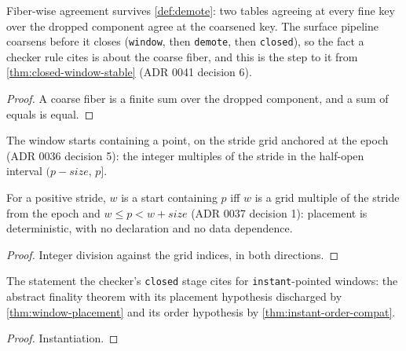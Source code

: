 \begin{theorem}
  \label{thm:demote-congr}\leanok
  Fiber-wise agreement survives \ref{def:demote}: two tables agreeing at
  every fine key over the dropped component agree at the coarsened key.
  The surface pipeline coarsens before it closes (\texttt{window}, then
  \texttt{demote}, then \texttt{closed}), so the fact a checker rule
  cites is about the coarse fiber, and this is the step to it from
  \ref{thm:closed-window-stable} (ADR 0041 decision 6).
\end{theorem}
\begin{proof}\leanok
  A coarse fiber is a finite sum over the dropped component, and a sum
  of equals is equal.
\end{proof}

\begin{definition}
  \label{def:window-starts}\leanok
  The window starts containing a point, on the stride grid anchored at
  the epoch (ADR 0036 decision 5): the integer multiples of the stride
  in the half-open interval $(p - \mathit{size},\, p]$.
\end{definition}

\begin{theorem}
  \label{thm:window-placement}
  \leanok
  For a positive stride, $w$ is a start containing $p$ iff $w$ is a
  grid multiple of the stride from the epoch and
  $w \le p < w + \mathit{size}$ (ADR 0037 decision 1): placement is
  deterministic, with no declaration and no data dependence.
\end{theorem}
\begin{proof}\leanok
  Integer division against the grid indices, in both directions.
\end{proof}

\begin{theorem}
  \label{thm:closed-window-stable-instant}
  \leanok
  The statement the checker's \texttt{closed} stage cites for
  \texttt{instant}-pointed windows: the abstract finality theorem with
  its placement hypothesis discharged by \ref{thm:window-placement} and
  its order hypothesis by \ref{thm:instant-order-compat}.
\end{theorem}
\begin{proof}\leanok
  Instantiation.
\end{proof}

